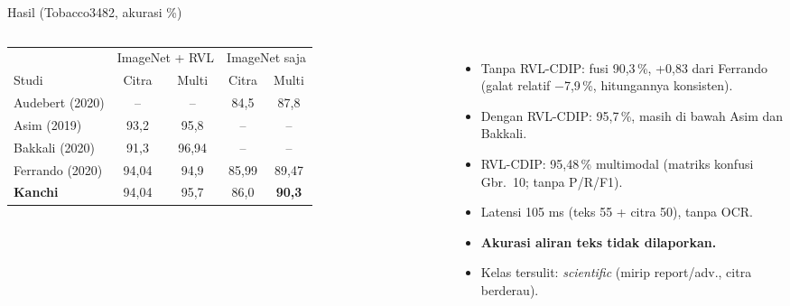 \documentclass[aspectratio=169,10pt]{beamer}
\newcommand\kecil{\fontsize{8}{9.5}\selectfont}
\newcommand\awas[1]{\textcolor{merah}{\textbf{#1}}}
\begin{document}
\begin{frame}{Hasil (Tobacco3482, akurasi \%)}
  \begin{columns}[T]
    \kecil
    \begin{tabular}{lcccc}
      \toprule
      & \multicolumn{2}{c}{ImageNet + RVL} & \multicolumn{2}{c}{ImageNet saja} \\
      \cmidrule(lr){2-3}\cmidrule(lr){4-5}
      Studi & Citra & Multi & Citra & Multi \\ \midrule
      Audebert (2020) & -- & -- & 84,5 & 87,8 \\
      Asim (2019) & 93,2 & 95,8 & -- & -- \\
      Bakkali (2020) & 91,3 & 96,94 & -- & -- \\
      Ferrando (2020) & 94,04 & 94,9 & 85,99 & 89,47 \\
      \textbf{Kanchi} & 94,04 & 95,7 & 86,0 & \textbf{90,3} \\ \bottomrule
    \end{tabular}
    \begin{itemize}\kecil
      \item Tanpa RVL-CDIP: fusi 90,3\,\%, +0,83 dari Ferrando (galat relatif $-$7,9\,\%, hitungannya konsisten).
      \item Dengan RVL-CDIP: 95,7\,\%, masih di bawah Asim dan Bakkali.
      \item RVL-CDIP: 95,48\,\% multimodal (matriks konfusi Gbr.\ 10; tanpa P/R/F1).
      \item Latensi 105 ms (teks 55 + citra 50), tanpa OCR.
      \item \awas{Akurasi aliran teks tidak dilaporkan.}
      \item Kelas tersulit: \emph{scientific} (mirip report/adv., citra berderau).
    \end{itemize}
  \end{columns}
\end{frame}
\end{document}
